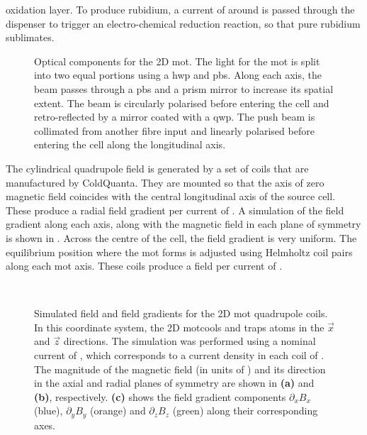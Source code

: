 oxidation layer. To produce rubidium, a current of around  is passed through the dispenser
to trigger an electro-chemical reduction reaction, so that pure rubidium sublimates.
\begin{figure}[!htbp]
	\centering
	\def\svgwidth{0.5\textwidth}
	
	\caption[Optical components for the 2D \ac{mot}]{Optical components for the 2D \ac{mot}. The light for the \ac{mot} is split into two equal portions using a \ac{hwp} and \ac{pbs}. Along each axis, the beam passes through a \ac{pbs} and a prism mirror to increase its spatial extent. The beam is circularly polarised before entering the cell and retro-reflected by a mirror coated with a \ac{qwp}. The push beam is collimated from another fibre input and linearly polarised before entering the cell along the longitudinal axis.}
	\label{fig:2D_mot_optics}
\end{figure}
\par\noindent The cylindrical quadrupole field is generated by a set of coils
that are manufactured by ColdQuanta. They are mounted so that the axis of
zero magnetic field coincides with the central longitudinal axis of the source
cell. These produce a radial field gradient per current of
. A simulation of the field
gradient along each axis, along with the magnetic field in each plane of
symmetry is shown in .  
Across the centre of the cell, the field gradient is very uniform. The equilibrium position where the \ac{ mot} forms is adjusted using Helmholtz coil pairs along each \ac{mot} axis. These coils produce a field per current of
.
\begin{figure}[!htbp]
	\centering
	\def\svgwidth{\columnwidth}
	\\
	\caption[Simulated field and field gradients for the 2D \ac{mot} quadrupole
		coils]{Simulated field and field gradients for the 2D \ac{mot}
		quadrupole coils. In this coordinate system, the 2D \ac{mot}cools and
		traps atoms in the \(\vec{x}\) and \(\vec{z}\) directions. The
		simulation was performed using a nominal current of
		, which corresponds to a current density in each
		coil of . The magnitude of
		the magnetic field (in units of \sivalue{}{\gauss}) and its direction in
		the axial and radial planes of symmetry are shown in \textbf{(a)} and
		\textbf{(b)}, respectively. \textbf{(c)} shows the field gradient
		components \(\partial_x B_x\) (blue), \(\partial_y B_y\) (orange) and
		\(\partial_z B_z\) (green) along their corresponding axes.}
	\label{fig:2d_mot_field_gradient}
\end{figure}
